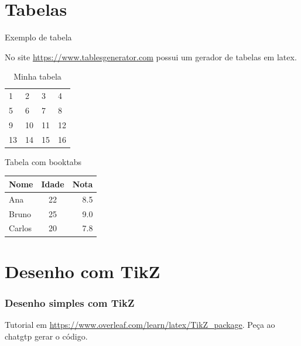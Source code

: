 \documentclass{beamer}
\begin{document}
\section{Tabelas}
\begin{frame}[fragile]{Exemplo de tabela}

No site \url{https://www.tablesgenerator.com} possui um gerador de tabelas em latex.

\begin{table}[]
\centering
\begin{tabular}{llll}
\hline
1 & 2 & 3 & 4             \\
5 & 6 & 7 & 8             \\
9 & 10 & 11 & 12             \\
13 & 14 & 15 & 16             \\ \hline
\end{tabular}
\caption{Minha tabela}
\end{table}


\end{frame}

\begin{frame}{Tabela com booktabs}

\centering
\begin{tabular}{lcr}
\toprule
Nome & Idade & Nota \\
\midrule
Ana & 22 & 8.5 \\
Bruno & 25 & 9.0 \\
Carlos & 20 & 7.8 \\
\bottomrule
\end{tabular}

\end{frame}



\section{Desenho com TikZ}
\begin{frame}
\frametitle{Desenho simples com TikZ}

Tutorial em \url{https://www.overleaf.com/learn/latex/TikZ_package}. Peça ao chatgtp gerar o código.

\begin{center}
\end{center}

\end{frame}
\end{document}
